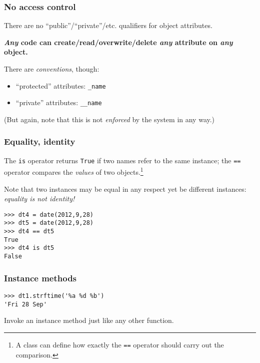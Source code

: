 \documentclass[english,serif,mathserif,xcolor=pdftex,dvipsnames,table]{beamer}
\begin{document}
\begin{frame}
  \frametitle{No access control}
  There are no ``public''/``private''/etc. qualifiers for object
  attributes.

  \+
  \textbf{\emph{Any} code can create/read/overwrite/delete \emph{any} attribute on
    \emph{any} object.}

  \+
  There are \emph{conventions}, though:
  \begin{itemize}
  \item ``protected'' attributes: \texttt{\_name}
  \item ``private'' attributes: \texttt{\_\_name}
  \end{itemize}
  (But again, note that this is not \emph{enforced} by the system in
  any way.)

\end{frame}


\begin{frame}
  \frametitle{Equality, identity}
  The \texttt{is} operator returns \texttt{True} if two names refer to
  the same instance; the \texttt{==} operator compares the
  \emph{values} of two objects.\footnote{A class can define how
    exactly the \texttt{==} operator should carry out the comparison.}

  \+
  Note that two instances may be equal in any respect yet be
  different instances: \emph{equality is not identity!}
\begin{lstlisting}
>>> dt4 = date(2012,9,28)
>>> dt5 = date(2012,9,28)
>>> dt4 == dt5
True
>>> dt4 is dt5
False
\end{lstlisting}
\end{frame}


\begin{frame}[fragile]
  \frametitle{Instance methods}
\begin{lstlisting}[showstringspaces=false]
>>> dt1.strftime('%a %d %b')
'Fri 28 Sep'
\end{lstlisting}

  \+
  Invoke an instance method just like any other function.
\end{frame}
\end{document}

